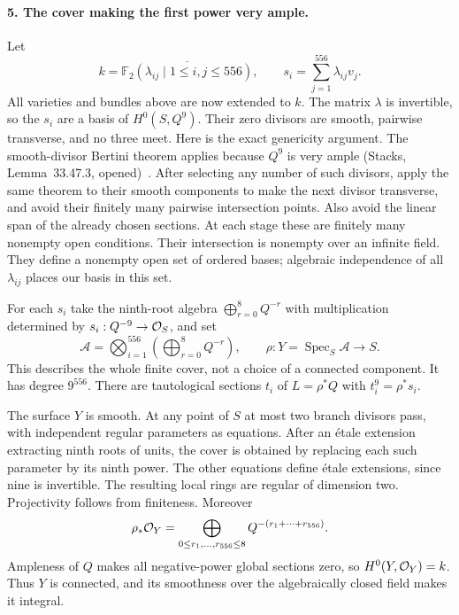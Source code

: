 \paragraph{5. The cover making the first power very ample.}
Let
\[
 k=\overline{\mathbb F_2(\lambda_{ij}\mid1\leq i,j\leq556)},
 \qquad s_i=\sum_{j=1}^{556}\lambda_{ij}v_j.
\]
All varieties and bundles above are now extended to $k$. The matrix
$\lambda$ is invertible, so the $s_i$ are a basis of $H^0(S,Q^9)$.
Their zero divisors are smooth, pairwise transverse, and no three
meet. Here is the exact genericity argument. The smooth-divisor
Bertini theorem applies because $Q^9$ is very ample (Stacks,
Lemma~33.47.3, opened)~\cite{StacksBertini}. After selecting any number of such divisors,
apply the same theorem to their smooth components to make the next
divisor transverse, and avoid their finitely many pairwise
intersection points. Also avoid the linear span of the already
chosen sections. At each stage these are finitely many nonempty
open conditions. Their intersection is nonempty over an infinite
field. They define a nonempty open set of ordered bases; algebraic
independence of all $\lambda_{ij}$ places our basis in this set.

For each $s_i$ take the ninth-root algebra
$\bigoplus_{r=0}^{8}Q^{-r}$ with multiplication determined by
$s_i:Q^{-9}\to\mathcal O_S$, and set
\begin{equation}\label{a:root-algebra}
 \mathcal A=\bigotimes_{i=1}^{556}
       \left(\bigoplus_{r=0}^{8}Q^{-r}\right),\qquad
 \rho:Y=\operatorname{Spec}_S\mathcal A\longrightarrow S.
\end{equation}
This describes the whole finite cover, not a choice of a connected
component. It has degree $9^{556}$. There are tautological sections
$t_i$ of $L=\rho^*Q$ with $t_i^9=\rho^*s_i$.

The surface $Y$ is smooth. At any point of $S$ at most two branch
divisors pass, with independent regular parameters as equations.
After an étale extension extracting ninth roots of units, the cover
is obtained by replacing each such parameter by its ninth power.
The other equations define étale extensions, since nine is
invertible. The resulting local rings are regular of dimension two.
Projectivity follows from finiteness. Moreover
\begin{equation}\label{a:root-directsum}
 \rho_*\mathcal O_Y=
 \bigoplus_{0\leq r_1,\ldots,r_{556}\leq8}
                   Q^{-(r_1+\cdots+r_{556})}.
\end{equation}
Ampleness of $Q$ makes all negative-power global sections zero, so
$H^0(Y,\mathcal O_Y)=k$. Thus $Y$ is connected, and its smoothness over the
algebraically closed field makes it integral.

